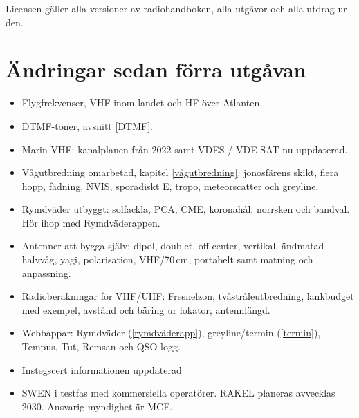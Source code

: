 Licensen gäller alla versioner av radiohandboken, alla utgåvor och
alla utdrag ur den.


\clearpage

\section{Ändringar sedan förra utgåvan}

\begin{itemize}%
        \item Flygfrekvenser, VHF inom landet och HF över Atlanten.

	\item DTMF-toner, avsnitt \ref{DTMF}.

	\item Marin VHF: kanalplanen från 2022 samt VDES / VDE-SAT nu uppdaterad.

	\item Vågutbredning omarbetad, kapitel \ref{vågutbredning}:
	      jonosfärens skikt, flera hopp, fädning, NVIS, sporadiskt E,
	      tropo, meteorscatter och greyline.

	    \item Rymdväder utbyggt: solfackla, PCA, CME, koronahål, norrsken
	      och bandval. Hör ihop med Rymdväderappen.

	    \item Antenner att bygga själv: dipol, doublet,
              off-center, vertikal, ändmatad halvvåg, yagi,
              polarisation, VHF/70\,cm, portabelt samt matning och
              anpassning.

	    \item Radioberäkningar för VHF/UHF: Fresnelzon, tvåstråleutbredning,
	      länkbudget med exempel, avstånd och bäring ur lokator,
	      antennlängd.

	    \item Webbappar: Rymdväder (\ref{rymdväderapp}), greyline/termin
	      (\ref{termin}), Tempus, Tut, Remsan och QSO-logg.

	    \item Instegscert informationen uppdaterad

	    \item SWEN i testfas med kommersiella operatörer. RAKEL planeras
	      avvecklas 2030. Ansvarig myndighet är MCF.
\end{itemize}
